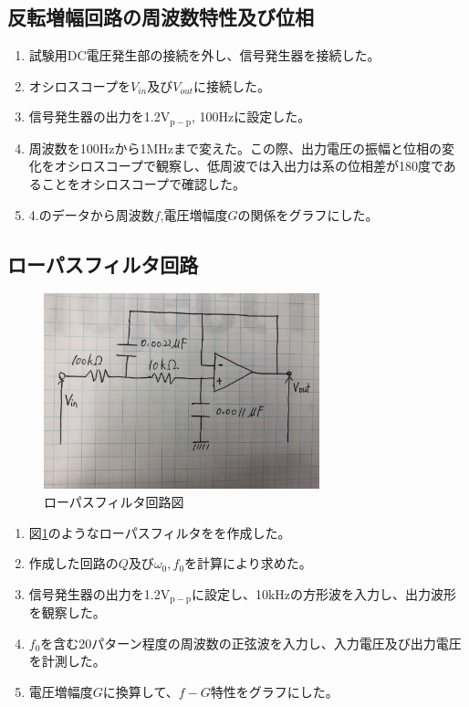 \documentclass[a4paper,11pt,uplatex]{jsarticle}
\begin{document}
\subsection{反転増幅回路の周波数特性及び位相}
\begin{enumerate}
  \item 試験用DC電圧発生部の接続を外し、信号発生器を接続した。
  \item オシロスコープを$V_{in}$及び$V_{out}$に接続した。
  \item 信号発生器の出力を1.2$\mathrm{V_{p-p}}$, 100Hzに設定した。
  \item 周波数を100Hzから1MHzまで変えた。この際、出力電圧の振幅と位相の変化をオシロスコープで観察し、低周波では入出力は系の位相差が180度であることをオシロスコープで確認した。
  \item 4.のデータから周波数$f$,電圧増幅度$G$の関係をグラフにした。
\end{enumerate}

\subsection{ローパスフィルタ回路}
\begin{figure}[H]
	\begin{center}
		\includegraphics[width=8cm]{画像/ローパス1.jpg}
		\caption{ローパスフィルタ回路図}
		\label{ローパスフィルタ}
	\end{center}
\end{figure}

\begin{enumerate}
  \item 図\ref{ローパスフィルタ}のようなローパスフィルタをを作成した。
  \item 作成した回路の$Q$及び$\omega_0,f_0$を計算により求めた。
  \item 信号発生器の出力を1.2$\mathrm{V_{p-p}}$に設定し、10kHzの方形波を入力し、出力波形を観察した。
  \item $f_0$を含む20パターン程度の周波数の正弦波を入力し、入力電圧及び出力電圧を計測した。
  \item 電圧増幅度$G$に換算して、$f-G$特性をグラフにした。
\end{enumerate}
\end{document}
